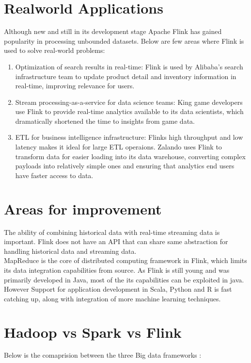 \section{Realworld Applications}
Although new and still in its development stage Apache Flink has gained popularity in processing unbounded datasets. Below are few areas where Flink is used to solve real-world problems:
\begin{enumerate}\item Optimization of search results in real-time: Flink is used by Alibaba’s search infrastructure team to update product detail and inventory information in real-time, improving relevance for users.
\item Stream processing-as-a-service for data science teams: King game developers use Flink to provide real-time analytics available to its data scientists, which dramatically shortened the time to insights from game data.
\item ETL for business intelligence infrastructure: Flinks high throughput and low latency makes it ideal for large ETL operaions. Zalando uses Flink to transform data for easier loading into its data warehouse, converting complex payloads into relatively simple ones and ensuring that analytics end users have faster access to data.~\cite{[link9]} \end{enumerate}
\section{Areas for improvement}
The ability of combining historical data with real-time streaming data is important. Flink does not have an API that can share same abstraction for handling historical data and streaming data.~\cite{[3]}\\
MapReduce is the core of distributed computing framework in Flink, which limits its data integration capabilities from source.
As Flink is still young and was primarily developed in Java, most of the its capabilities can be exploited in java. However Support for application development in Scala, Python and R is fast catching up, along with integration of more machine learning techniques. 

\section{Hadoop vs Spark vs Flink}

Below is the comaprision between the three Big data frameworks :

